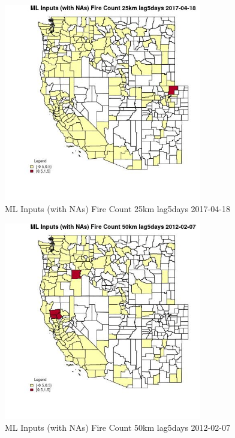 \begin{figure} 
\centering  
\includegraphics[width=0.77\textwidth]{Code_Outputs/Report_ML_input_PM25_Step4_part_f_de_duplicated_aves_prioritize_24hr_obswNAs_CountyFire_Count_25km_lag5daysMean2017-04-18.jpg} 
\caption{\label{fig:Report_ML_input_PM25_Step4_part_f_de_duplicated_aves_prioritize_24hr_obswNAsCountyFire_Count_25km_lag5daysMean2017-04-18}ML Inputs (with NAs) Fire Count 25km lag5days 2017-04-18} 
\end{figure} 
 

\begin{figure} 
\centering  
\includegraphics[width=0.77\textwidth]{Code_Outputs/Report_ML_input_PM25_Step4_part_f_de_duplicated_aves_prioritize_24hr_obswNAs_CountyFire_Count_50km_lag5daysMean2012-02-07.jpg} 
\caption{\label{fig:Report_ML_input_PM25_Step4_part_f_de_duplicated_aves_prioritize_24hr_obswNAsCountyFire_Count_50km_lag5daysMean2012-02-07}ML Inputs (with NAs) Fire Count 50km lag5days 2012-02-07} 
\end{figure} 
 

